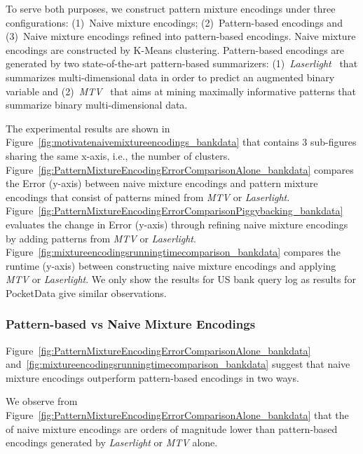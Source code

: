 To serve both purposes, we construct pattern mixture encodings under three configurations: (1)~Naive mixture encodings; (2)~Pattern-based encodings and (3)~Naive mixture encodings refined into pattern-based encodings.
Naive mixture encodings are constructed by K-Means clustering. 
Pattern-based encodings are generated by two state-of-the-art pattern-based summarizers: 
(1)~\textit{Laserlight}~\cite{DBLP:journals/pvldb/GebalyAGKS14} that summarizes multi-dimensional data in order to predict an augmented binary variable and 
(2)~\textit{MTV}~\cite{DBLP:journals/tkdd/MampaeyVT12} that aims at mining maximally informative patterns that summarize binary multi-dimensional data. 

The experimental results are shown in Figure~\ref{fig:motivatenaivemixtureencodings_bankdata} that contains 3 sub-figures sharing the same x-axis, i.e., the number of clusters.
Figure~\ref{fig:PatternMixtureEncodingErrorComparisonAlone_bankdata} compares the Error (y-axis) between naive mixture encodings and pattern mixture encodings that consist of patterns mined from \textit{MTV} or \textit{Laserlight}.
Figure~\ref{fig:PatternMixtureEncodingErrorComparisonPiggybacking_bankdata} evaluates the change in Error (y-axis) through refining naive mixture encodings by adding patterns from \textit{MTV} or \textit{Laserlight}.
Figure~\ref{fig:mixtureencodingsrunningtimecomparison_bankdata} compares the runtime (y-axis) between constructing naive mixture encodings and applying \textit{MTV} or \textit{Laserlight}.
We only show the results for US bank query log as results for PocketData give similar observations. 

\subsubsection{Pattern-based vs Naive Mixture Encodings}
\label{sec:Replacing_Naive_Mixture_Encodings}
Figure~\ref{fig:PatternMixtureEncodingErrorComparisonAlone_bankdata} and~\ref{fig:mixtureencodingsrunningtimecomparison_bankdata} suggest that naive mixture encodings outperform pattern-based encodings in two ways.

\tinysection{\errorname}
We observe from Figure~\ref{fig:PatternMixtureEncodingErrorComparisonAlone_bankdata} that the \errorname of naive mixture encodings are orders of magnitude lower than pattern-based encodings generated by \textit{Laserlight} or \textit{MTV} alone.

